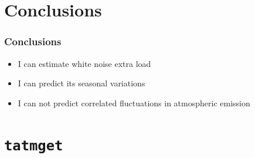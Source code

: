 \documentclass[10pt,aspectratio=169]{beamer}
\newcommand{\cmark}{\ding{51}}%
\newcommand{\xmark}{\ding{55}}%
\begin{document}
\section{Conclusions}

\begin{frame}[label=1]
\frametitle{Conclusions}

\begin{itemize}
        \item<1-> I can estimate \alert{white noise} extra load
        {\large \textcolor{green}{\cmark}}
        \item<2-> I can predict its \alert{seasonal variations}
        {\large \textcolor{green}{\cmark}}
        \item<3-> I can not predict \alert{correlated fluctuations} in
        atmospheric emission {\large \textcolor{red}{\xmark}}\\
\end{itemize}

\vspace{1.5cm}


\end{frame}

\appendix

\section{\texttt{tatmget}}
\end{document}
